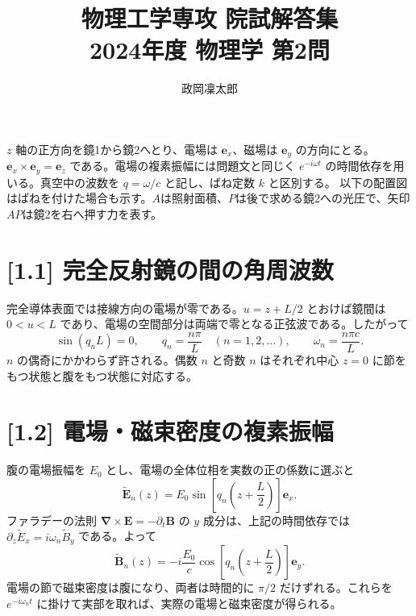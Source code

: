 \documentclass[11pt,a4paper]{article}
\title{物理工学専攻 院試解答集\\2024年度 物理学 第2問}
\author{政岡凜太郎}
\date{}
\begin{document}
\maketitle

$z$ 軸の正方向を鏡1から鏡2へとり、電場は $\boldsymbol{e}_x$、磁場は $\boldsymbol{e}_y$ の方向にとる。$\boldsymbol{e}_x\times\boldsymbol{e}_y=\boldsymbol{e}_z$ である。電場の複素振幅には問題文と同じく $e^{-i\omega t}$ の時間依存を用いる。真空中の波数を $q=\omega/c$ と記し、ばね定数 $k$ と区別する。
以下の配置図はばねを付けた場合も示す。$A$は照射面積、$P$は後で求める鏡2への光圧で、矢印$AP$は鏡2を右へ押す力を表す。

\begin{center}
\end{center}

\section*{[1.1] 完全反射鏡の間の角周波数}
完全導体表面では接線方向の電場が零である。$u=z+L/2$ とおけば鏡間は $0<u<L$ であり、電場の空間部分は両端で零となる正弦波である。したがって
\[
 \sin(q_nL)=0,\qquad q_n=\frac{n\pi}{L}\quad(n=1,2,\ldots),
 \qquad \boxed{\omega_n=\frac{n\pi c}{L}}.
\]
$n$ の偶奇にかかわらず許される。偶数 $n$ と奇数 $n$ はそれぞれ中心 $z=0$ に節をもつ状態と腹をもつ状態に対応する。

\section*{[1.2] 電場・磁束密度の複素振幅}
腹の電場振幅を $E_0$ とし、電場の全体位相を実数の正の係数に選ぶと
\[
 \boxed{\widetilde{\boldsymbol E}_n(z)
 =E_0\sin\!\left[q_n\left(z+\frac L2\right)\right]\boldsymbol e_x}.
\]
ファラデーの法則 $\boldsymbol\nabla\times\boldsymbol E=-\partial_t\boldsymbol B$ の $y$ 成分は、上記の時間依存では
$\partial_z\widetilde E_x=i\omega_n\widetilde B_y$ である。よって
\[
 \boxed{\widetilde{\boldsymbol B}_n(z)
 =-i\frac{E_0}{c}\cos\!\left[q_n\left(z+\frac L2\right)\right]\boldsymbol e_y}.
\]
電場の節で磁束密度は腹になり、両者は時間的に $\pi/2$ だけずれる。これらを $e^{-i\omega_nt}$ に掛けて実部を取れば、実際の電場と磁束密度が得られる。
\end{document}

